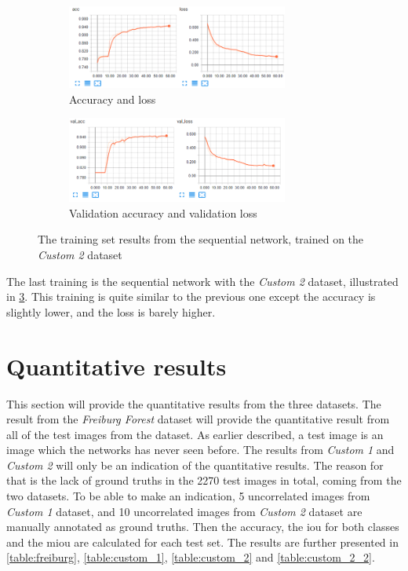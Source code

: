 \documentclass[USenglish]{ifimaster}  %
\begin{document}
\begin{figure}[H]
\centering
\begin{subfigure}[b]{\textwidth}
\centering
\includegraphics[width=0.8\textwidth]{bilder/custom_2_training/Custom_2_sequential_training_acc_results.png}
\caption{Accuracy and loss}
\label{fig:custom_2_sequential_acc_result}
\end{subfigure}
\hfill
\begin{subfigure}[b]{\textwidth}
\centering
\includegraphics[width=0.8\textwidth]{bilder/custom_2_training/Custom_2_sequential_training_val_acc_results.png}
\caption{Validation accuracy and validation loss}
\label{fig:custom_2_sequential_val_acc_result}
\end{subfigure}
\caption{The training set results from the sequential network, trained on the \textit{Custom 2} dataset}
\label{fig:custom_2_sequential_result}
\end{figure}

The last training is the sequential network with the \textit{Custom 2} dataset, illustrated in \cref{fig:custom_2_sequential_result}. This training is quite similar to the previous one except the accuracy is slightly lower, and the loss is barely higher.

\section{Quantitative results}
This section will provide the quantitative results from the three datasets. The result from the \textit{Freiburg Forest} dataset will provide the quantitative result from all of the test images from the dataset. As earlier described, a test image is an image which the networks has never seen before. The results from \textit{Custom 1} and \textit{Custom 2} will only be an indication of the quantitative results. The reason for that is the lack of ground truths in the 2270 test images in total, coming from the two datasets. To be able to make an indication, 5 uncorrelated images from \textit{Custom 1} dataset, and 10 uncorrelated images from \textit{Custom 2} dataset are manually annotated as ground truths. Then the accuracy, the \ac{iou} for both classes and the \ac{miou} are calculated for each test set. The results are further presented in \cref{table:freiburg}, \cref{table:custom_1}, \cref{table:custom_2} and \cref{table:custom_2_2}.
\end{document}

